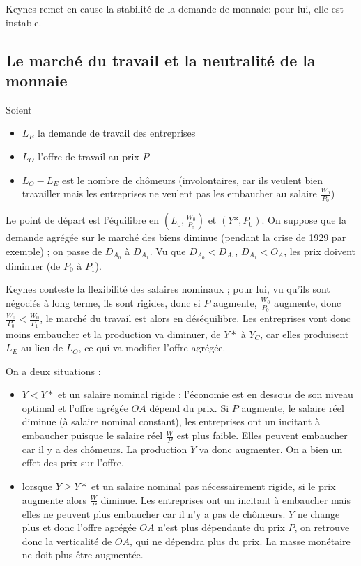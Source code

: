 	Keynes remet en cause la stabilité de la demande de monnaie:  pour lui, elle est instable.
	
	\subsection{Le marché du travail et la neutralité de la monnaie}
	
	
	
	
	Soient
	
	\begin{itemize}
		\item $L_E$ la demande de travail des entreprises
		\item $L_O$ l'offre de travail au prix $P$
		\item $L_O - L_E$ est le nombre de chômeurs (involontaires, car ils veulent bien travailler mais les entreprises ne veulent pas les embaucher au salaire $\frac{W_0}{P_0}$)
	\end{itemize}
	
	Le point de départ est l'équilibre en $(L_0, \frac{W_0}{P_0})$ et $(Y*, P_0)$. On suppose que la demande agrégée sur le marché des biens diminue (pendant la crise de 1929 par exemple) ; on passe de $D_{A_0}$ à $D_{A_1}$.  Vu que $D_{A_0} < D_{A_1}$, $D_{A_1} < O_A$, les prix doivent diminuer (de $P_0$ à $P_1$).
	
	Keynes conteste la flexibilité des salaires nominaux ; pour lui, vu qu'ils sont négociés à long terme, ils sont rigides, donc si $P$ augmente, $\frac{W_0}{P_0}$ augmente, donc $\frac{W_0}{P_0} <\frac{W_0}{P_1}$, le marché du travail est alors en déséquilibre. Les entreprises vont donc moins embaucher et la production va diminuer, de $Y*$ à $Y_C$, car elles produisent $L_E$ au lieu de $L_O$, ce qui va modifier l'offre agrégée.
	
	On a deux situations :
	
	\begin{itemize}
		\item $Y < Y*$ et un salaire nominal rigide : l'économie est en dessous de son niveau optimal et l'offre agrégée $OA$ dépend du prix. Si $P$ augmente, le salaire réel diminue (à salaire nominal constant), les entreprises ont un incitant à embaucher puisque le salaire réel $\frac{W}{P}$ est plus faible. Elles peuvent embaucher car il y a des chômeurs. La production $Y$ va donc augmenter. On a bien un effet des prix sur l'offre.
		
		\item lorsque $Y \geq Y*$ et un salaire nominal pas nécessairement rigide, si le prix augmente alors $\frac{W}{P}$ diminue. Les entreprises ont un incitant à embaucher mais elles ne peuvent plus embaucher car il n'y a pas de chômeurs. $Y$ ne change plus et donc l'offre agrégée $OA$ n'est plus dépendante du prix $P$, on retrouve donc la verticalité de $OA$, qui ne dépendra plus du prix. La masse monétaire ne doit plus être augmentée.
	\end{itemize}
	
